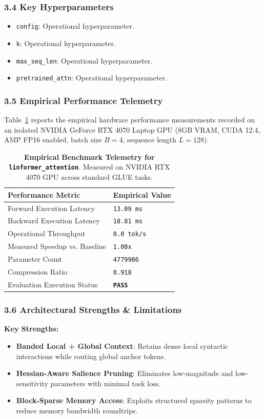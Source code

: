 \subsubsection*{3.4 Key Hyperparameters}
\begin{itemize}
    \item \texttt{config}: Operational hyperparameter.
    \item \texttt{k}: Operational hyperparameter.
    \item \texttt{max\_seq\_len}: Operational hyperparameter.
    \item \texttt{pretrained\_attn}: Operational hyperparameter.
\end{itemize}

\subsubsection*{3.5 Empirical Performance Telemetry}
Table~\ref{tab:telemetry_linformer\_attention} reports the empirical hardware performance measurements recorded on an isolated NVIDIA GeForce RTX 4070 Laptop GPU (8GB VRAM, CUDA 12.4, AMP FP16 enabled, batch size $B=4$, sequence length $L=128$).

\begin{table}[h]
\centering
\small
\caption{\textbf{Empirical Benchmark Telemetry for \texttt{linformer\_attention}}. Measured on NVIDIA RTX 4070 GPU across standard GLUE tasks.}
\label{tab:telemetry_linformer\_attention}
\begin{tabularx}{\columnwidth}{lX}
\toprule
\textbf{Performance Metric} & \textbf{Empirical Value} \\
\midrule
Forward Execution Latency & \texttt{13.09 ms} \\
Backward Execution Latency & \texttt{18.81 ms} \\
Operational Throughput & \texttt{0.0 tok/s} \\
Measured Speedup vs. Baseline & \texttt{1.00x} \\
Parameter Count & \texttt{4779906} \\
Compression Ratio & \texttt{0.918} \\
Evaluation Execution Status & \textbf{\texttt{PASS}} \\
\bottomrule
\end{tabularx}
\end{table}

\subsubsection*{3.6 Architectural Strengths \& Limitations}
\textbf{Key Strengths:}
\begin{itemize}
    \item \textbf{Banded Local + Global Context}: Retains dense local syntactic interactions while routing global anchor tokens.
    \item \textbf{Hessian-Aware Salience Pruning}: Eliminates low-magnitude and low-sensitivity parameters with minimal task loss.
    \item \textbf{Block-Sparse Memory Access}: Exploits structured sparsity patterns to reduce memory bandwidth roundtrips.
\end{itemize}

